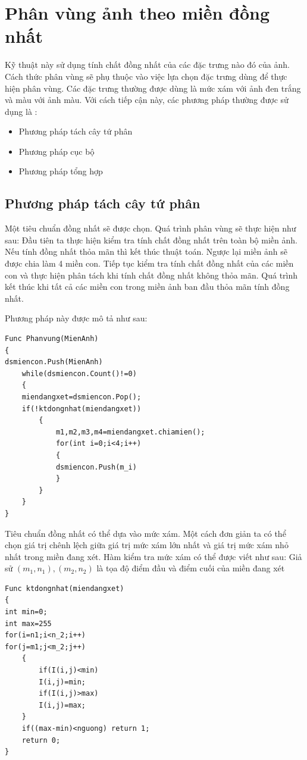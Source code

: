 \documentclass[12pt, oneside, a4]{book}
\begin{document}
\section{Phân vùng ảnh theo miền đồng nhất}
Kỹ thuật này sử dụng tính chất đồng nhất của các đặc trưng nào đó của ảnh. Cách thức phân vùng sẽ phụ thuộc vào việc lựa chọn đặc trưng dùng để thực hiện phân vùng. Các đặc trưng thường được dùng là mức xám với ảnh đen trắng và màu với ảnh màu. Với cách tiếp cận này, các phương pháp thường được sử dụng là :
\begin{itemize}
\item  Phương pháp tách cây tứ phân
\item Phương pháp cục bộ
\item Phương pháp tổng hợp
\end{itemize}
\subsection{Phương pháp tách cây tứ phân}
Một tiêu chuẩn đồng nhất sẽ được chọn. Quá trình phân vùng sẽ thực hiện như sau: Đầu tiên ta thực hiện kiểm tra tính chất đồng nhất trên toàn bộ miền ảnh. Nếu tính đồng nhất thỏa mãn thì kết thúc thuật toán. Ngược lại miền ảnh sẽ được chia làm 4 miền con. Tiếp tục kiểm tra tính chất đồng nhất của các miền con và thực hiện phân tách khi tính chất đồng nhất không thỏa mãn. Quá trình kết thúc khi tất cả các miền con trong miền ảnh ban đầu thỏa mãn tính đồng nhất.

Phương pháp này được mô tả như sau:
\begin{lstlisting}
Func Phanvung(MienAnh)
{
dsmiencon.Push(MienAnh)
	while(dsmiencon.Count()!=0)
	{
	miendangxet=dsmiencon.Pop();
	if(!ktdongnhat(miendangxet))
		{
			m1,m2,m3,m4=miendangxet.chiamien();
			for(int i=0;i<4;i++)
			{
			dsmiencon.Push(m_i)
			}
		}
	}
}
\end{lstlisting}

Tiêu chuẩn đồng nhất có thể dựa vào mức xám. Một cách đơn giản ta có thể chọn giá trị chênh lệch giữa giá trị mức xám lớn nhất và giá trị mức xám nhỏ nhất trong miền đang xét. Hàm kiểm tra mức xám có thể được viết như sau: Giả sử $(m_1,n_1), (m_2,n_2)$ là tọa độ điểm đầu và điểm cuối của miền đang xét
\begin{lstlisting}
Func ktdongnhat(miendangxet)
{
int min=0;
int max=255
for(i=n1;i<n_2;i++)
for(j=m1;j<m_2;j++)
	{
		if(I(i,j)<min)
		I(i,j)=min;
		if(I(i,j)>max)
		I(i,j)=max;
	}
	if((max-min)<nguong) return 1;
	return 0;
}
\end{lstlisting}
\end{document}
